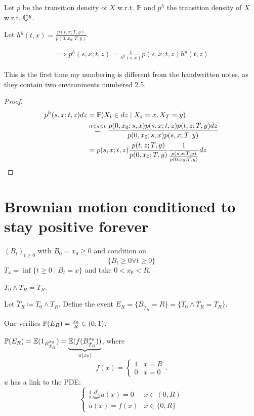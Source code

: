 \begin{lemma}\label{lem:2.7}
    Let $p$ be the transition density of $X$ w.r.t. $\mathbb{P}$ and $p^h$ the transition density of $X$ w.r.t. $\mathbb{Q}^y$.

    Let $h^y(t,x)=\frac{p(t,x;T,y)}{p(0,x_0;T,y)}$.

    \begin{align*}
        \implies p^h(s,x;t,z)=\frac{1}{h^y(s,x)}p(s,x;t,z)h^y(t,z)
    \end{align*}
\end{lemma}

\begin{aremark}
    This is the first time my numbering is different from the handwritten notes, as they contain two environments numbered 2.5.
\end{aremark}

\begin{proof}
    \begin{align*}
        p^h(s,x;t,z)dz&=\mathbb{P}(X_t\in dz\mid X_s=x,X_T=y)\\
        &\stackrel{0\leq s\leq t}{=}\frac{p(0,x_0;s,x)p(s,x;t,z)p(t,z;T,y)dz}{p(0,x_0;s,x)p(s,x;T,y)}\\
        &=p(s,x;t,z)\frac{p(t,z;T,y)}{p(0,x_0;T,y)}\frac{1}{\frac{p(s,x;T,y)}{p(0,x_0;T,y)}}dz\qedhere
    \end{align*}
\end{proof}

\section{Brownian motion conditioned to stay positive forever}

 $(B_t)_{t\geq 0}$ with $B_0=x_0\geq 0$ and condition on 
\[\{B_t\geq 0\forall t\geq 0\}\]
$T_x=\inf\{t\geq 0\mid B_t=x\}$ and take $0<x_0<R$.

$T_0\land T_R=T_R$.

Let $\tilde{T}_R\coloneqq T_0\land T_R$. Define the event $E_R=\{B_{\tilde{T}_R}=R\}=\{T_0\land T_R=T_R\}$.

One verifies $\mathbb{P}(E_R)=\frac{x_0}{R}\in (0,1)$.

$\mathbb{P}(E_R)=\mathbb{E}(1_{B_{\tilde{T}_R}^{x_0}})=\underbrace{\mathbb{E}(f(B_{\tilde{T}_R}^{x_0}))}_{u(x_0)}$, where 
\[f(x)=\begin{cases}
    1 & x= R\\
    0 & x=0
\end{cases}.\]
$u$ has a link to the PDE: 
\[\begin{cases}
    \frac{1}{2}\frac{\partial^2}{\partial x^2} u(x)=0&x\in (0,R)\\
    u(x)=f(x) & x\in \{0,R\}
\end{cases}\]

